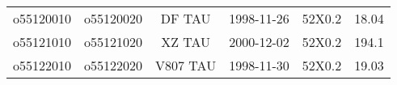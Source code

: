 \begin{table*}
\begin{center}
\begin{tabular}{cccccc}

o55120010& o55120020 & DF TAU & 1998-11-26 & 52X0.2 & 18.04 \\


o55121010& o55121020 & XZ TAU & 2000-12-02 & 52X0.2 & 194.1 \\


o55122010& o55122020 & V807 TAU & 1998-11-30 & 52X0.2 & 19.03 \\

\hline
\end{tabular}
\end{center}
\end{table*}

